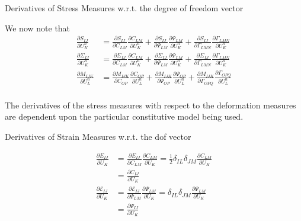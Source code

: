 \documentclass[11pt]{beamer}
\begin{document}
\begin{frame}{Derivatives of Stress Measures w.r.t. the degree of freedom vector}

We now note that
\begin{align*}
\frac{\partial S_{IJ}}{\partial U_{K}^n} &= \frac{\partial S_{IJ}}{\partial C_{LM}} \frac{\partial C_{LM}}{\partial U_{K}^n} + \frac{\partial S_{IJ}}{\partial \Psi_{LM}} \frac{\partial \Psi_{LM}}{\partial U_{K}^n} + \frac{\partial S_{IJ}}{\partial \Gamma_{LMN}} \frac{\partial \Gamma_{LMN}}{\partial U_{K}^n}\\
\frac{\partial \Sigma_{IJ}}{\partial U_{K}^n} &= \frac{\partial \Sigma_{IJ}}{\partial C_{LM}} \frac{\partial C_{LM}}{\partial U_{K}^n} + \frac{\partial \Sigma_{IJ}}{\partial \Psi_{LM}} \frac{\partial \Psi_{LM}}{\partial U_{K}^n} + \frac{\partial \Sigma_{IJ}}{\partial \Gamma_{LMN}} \frac{\partial \Gamma_{LMN}}{\partial U_{K}^n}\\
\frac{\partial M_{IJK}}{\partial U_{L}^n} &= \frac{\partial M_{IJK}}{\partial C_{OP}}\frac{\partial C_{OP}}{\partial U_L^n} + \frac{\partial M_{IJK}}{\partial \Psi_{OP}}\frac{\partial \Psi_{OP}}{\partial U_{L}^n} + \frac{\partial M_{IJK}}{\partial \Gamma_{OPQ}}\frac{\partial \Gamma_{OPQ}}{\partial U_{L}^n}\\
\end{align*}

The derivatives of the stress measures with respect to the deformation measures are dependent upon the particular constitutive model being used.

\end{frame}

\begin{frame}{Derivatives of Strain Measures w.r.t. the dof vector}

\begin{align*}
\frac{\partial E_{IJ}}{\partial U_{K}} &= \frac{\partial E_{IJ}}{\partial C_{LM}} \frac{\partial C_{LM}}{\partial U_K} = \frac{1}{2}\delta_{IL}\delta_{JM} \frac{\partial C_{LM}}{\partial U_K}\\
&= \frac{\partial C_{IJ}}{\partial U_K}\\
\frac{\partial \mathcal{E}_{IJ}}{\partial U_K} &= \frac{\partial \mathcal{E}_{IJ}}{\partial \Psi_{LM}} \frac{\partial \Psi_{LM}}{\partial U_K} = \delta_{IL}\delta_{JM} \frac{\partial \Psi_{LM}}{\partial U_K}\\
&= \frac{\partial \Psi_{IJ}}{\partial U_K}
\end{align*}

\end{frame}
\end{document}
